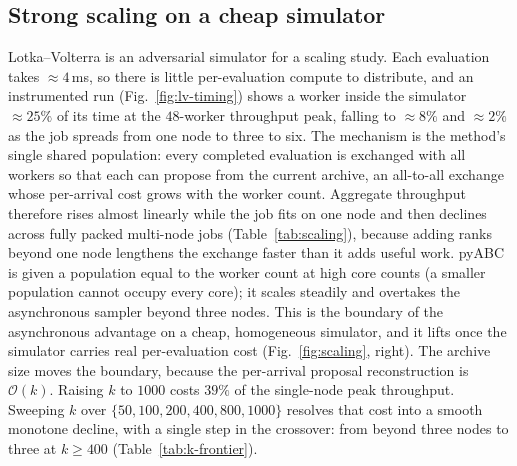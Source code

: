 \documentclass[pdflatex,sn-mathphys-num]{sn-jnl}
\theoremstyle{plain}
\theoremstyle{definition}
\begin{document}
\begin{appendices}
\subsection{Strong scaling on a cheap simulator}
Lotka--Volterra is an adversarial simulator for a scaling study. Each evaluation takes ${\approx}4$\,ms, so there is little per-evaluation compute to distribute, and an instrumented run (Fig.~\ref{fig:lv-timing}) shows a worker inside the simulator ${\approx}25\%$ of its time at the $48$-worker throughput peak, falling to ${\approx}8\%$ and ${\approx}2\%$ as the job spreads from one node to three to six. The mechanism is the method's single shared population: every completed evaluation is exchanged with all workers so that each can propose from the current archive, an all-to-all exchange whose per-arrival cost grows with the worker count. Aggregate throughput therefore rises almost linearly while the job fits on one node and then declines across fully packed multi-node jobs (Table~\ref{tab:scaling}), because adding ranks beyond one node lengthens the exchange faster than it adds useful work. pyABC is given a population equal to the worker count at high core counts (a smaller population cannot occupy every core); it scales steadily and overtakes the asynchronous sampler beyond three nodes. This is the boundary of the asynchronous advantage on a cheap, homogeneous simulator, and it lifts once the simulator carries real per-evaluation cost (Fig.~\ref{fig:scaling}, right). The archive size moves the boundary, because the per-arrival proposal reconstruction is $\mathcal{O}(k)$. Raising $k$ to $1000$ costs $39\%$ of the single-node peak throughput. Sweeping $k$ over $\{50,100,200,400,800,1000\}$ resolves that cost into a smooth monotone decline, with a single step in the crossover: from beyond three nodes to three at $k\ge400$ (Table~\ref{tab:k-frontier}).


\end{appendices}
\end{document}
